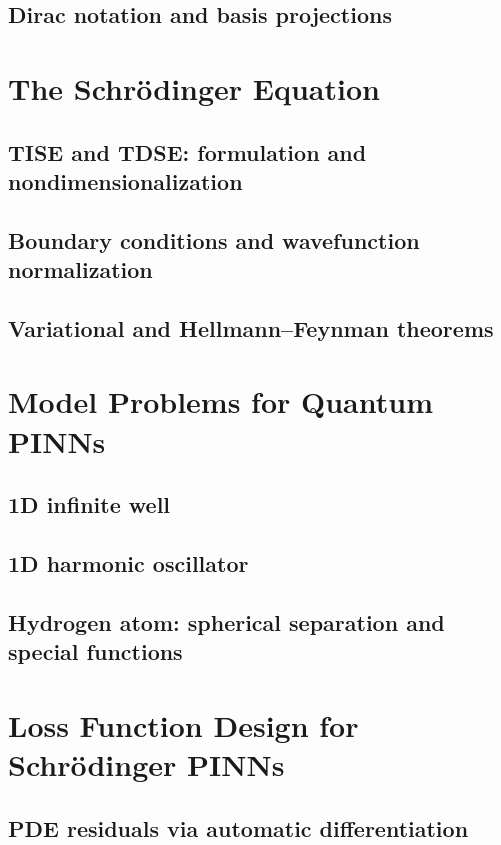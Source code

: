 \subsection{Dirac notation and basis projections}

\section{The Schr\"odinger Equation} %

\subsection{TISE and TDSE: formulation and nondimensionalization}

\subsection{Boundary conditions and wavefunction normalization}

\subsection{Variational and Hellmann--Feynman theorems}

\section{Model Problems for Quantum PINNs} %

\subsection{1D infinite well}

\subsection{1D harmonic oscillator}

\subsection{Hydrogen atom: spherical separation and special functions}

\section{Loss Function Design for Schr\"odinger PINNs} %

\subsection{PDE residuals via automatic differentiation}

